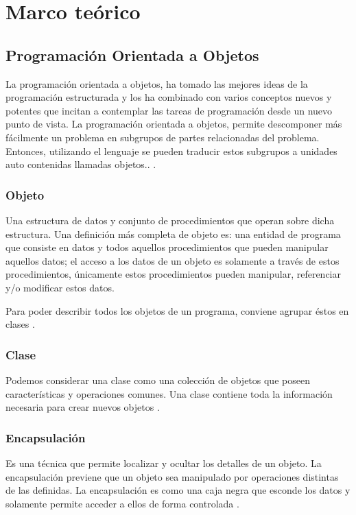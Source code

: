 \chapter{Marco teórico}

\section{Programación Orientada a Objetos}
La programación orientada a objetos, ha tomado las mejores ideas de la programación estructurada y los ha combinado con varios conceptos nuevos y potentes que incitan a contemplar las tareas de programación desde un nuevo punto de vista. La programación orientada a objetos, permite descomponer más fácilmente un problema en subgrupos de partes relacionadas del problema. Entonces, utilizando el lenguaje se pueden traducir estos subgrupos a unidades auto contenidas llamadas objetos.. \citep{izquierdo2007introduccion}.

\subsection{Objeto}
Una estructura de datos y conjunto de procedimientos que operan sobre dicha estructura. Una definición más completa de objeto es: una entidad de programa que consiste en datos y todos aquellos procedimientos que pueden manipular aquellos datos; el acceso a los datos de un objeto es solamente a través de estos procedimientos, únicamente estos procedimientos pueden manipular, referenciar y/o modificar estos datos.

Para poder describir todos los objetos de un programa, conviene agrupar éstos en clases \citep{izquierdo2007introduccion}.

\subsection{Clase}
Podemos considerar una clase como una colección de objetos que poseen características y operaciones comunes. Una clase contiene toda la información necesaria para crear nuevos objetos \citep{izquierdo2007introduccion}.

\subsection{Encapsulación}
Es una técnica que permite localizar y ocultar los detalles de un objeto. La encapsulación previene que un objeto sea manipulado por operaciones distintas de las definidas. La encapsulación es como una caja negra que esconde los datos y solamente permite acceder a ellos de forma controlada \citep{izquierdo2007introduccion}.

